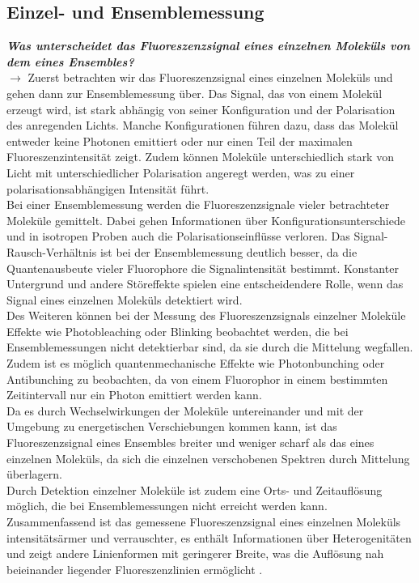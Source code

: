 \subsection{\label{subsec:FZV4}Einzel- und Ensemblemessung}
\textbf{\textit{Was unterscheidet das Fluoreszenzsignal eines einzelnen Moleküls von dem eines Ensembles?}} \\
$\rightarrow$
Zuerst betrachten wir das Fluoreszenzsignal eines einzelnen Moleküls und gehen dann zur Ensemblemessung über.
Das Signal, das von einem Molekül erzeugt wird, ist stark abhängig von seiner Konfiguration und der Polarisation
des anregenden Lichts. Manche Konfigurationen führen dazu, dass das Molekül entweder keine Photonen emittiert
oder nur einen Teil der maximalen Fluoreszenzintensität zeigt. Zudem können Moleküle unterschiedlich stark von
Licht mit unterschiedlicher Polarisation angeregt werden, was zu einer polarisationsabhängigen Intensität führt. \\
Bei einer Ensemblemessung werden die Fluoreszenzsignale vieler betrachteter Moleküle gemittelt. Dabei gehen
Informationen über Konfigurationsunterschiede und in isotropen Proben auch die Polarisationseinflüsse verloren.
Das Signal-Rausch-Verhältnis ist bei der Ensemblemessung deutlich besser, da die Quantenausbeute vieler Fluorophore
die Signalintensität bestimmt. Konstanter Untergrund und andere Störeffekte spielen eine entscheidendere Rolle,
wenn das Signal eines einzelnen Moleküls detektiert wird. \\
Des Weiteren können bei der Messung des Fluoreszenzsignals einzelner Moleküle Effekte wie Photobleaching oder
Blinking beobachtet werden, die bei Ensemblemessungen nicht detektierbar sind, da sie durch die Mittelung
wegfallen. Zudem ist es möglich quantenmechanische Effekte wie Photonbunching oder Antibunching zu beobachten,
da von einem Fluorophor in einem bestimmten Zeitintervall nur ein Photon emittiert werden kann. \\
Da es durch Wechselwirkungen der Moleküle untereinander und mit der Umgebung zu energetischen
Verschiebungen kommen kann, ist das Fluoreszenzsignal eines Ensembles breiter und weniger scharf als das
eines einzelnen Moleküls, da sich die einzelnen verschobenen Spektren durch Mittelung überlagern. \\
Durch Detektion einzelner Moleküle ist zudem eine Orts- und Zeitauflösung möglich, die bei Ensemblemessungen
nicht erreicht werden kann. \\
Zusammenfassend ist das gemessene Fluoreszenzsignal eines einzelnen Moleküls intensitätsärmer und verrauschter,
es enthält Informationen über Heterogenitäten und zeigt andere Linienformen mit geringerer Breite,
was die Auflösung nah beieinander liegender Fluoreszenzlinien ermöglicht \cite{P1, P2, Demtroder, SingEns}. \\
